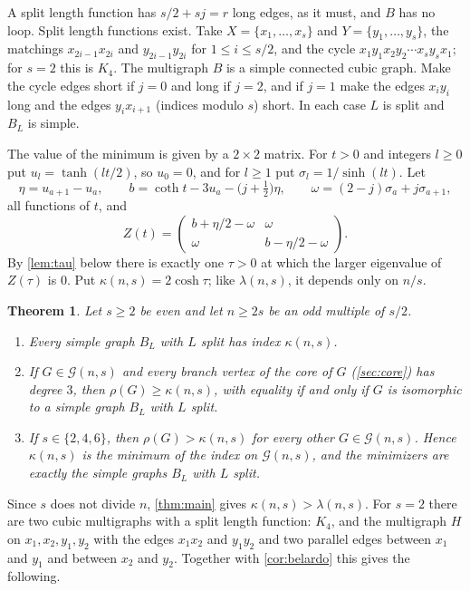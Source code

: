 \documentclass[11pt]{article}
\newtheorem{theorem}{Theorem}
\theoremstyle{definition}
\theoremstyle{remark}
\newcommand{\G}{\mathcal{G}}
\begin{document}
A split length function has $s/2+sj=r$ long edges, as it must, and $B$ has no loop. Split length functions exist. Take
$X=\{x_1,\dots,x_s\}$ and $Y=\{y_1,\dots,y_s\}$, the matchings $x_{2i-1}x_{2i}$ and $y_{2i-1}y_{2i}$ for $1\le i\le s/2$,
and the cycle $x_1y_1x_2y_2\cdots x_sy_sx_1$; for $s=2$ this is $K_4$. The multigraph $B$ is a simple connected cubic
graph. Make the cycle edges short if $j=0$ and long if $j=2$, and if $j=1$ make the edges $x_iy_i$ long and the edges
$y_ix_{i+1}$ (indices modulo $s$) short. In each case $L$ is split and $B_L$ is simple.

The value of the minimum is given by a $2\times2$ matrix. For $t>0$ and integers $l\ge0$ put $u_l=\tanh(lt/2)$, so
$u_0=0$, and for $l\ge1$ put $\sigma_l=1/\sinh(lt)$. Let
\[
\eta=u_{a+1}-u_a,\qquad b=\coth t-3u_a-\bigl(j+\tfrac12\bigr)\eta,\qquad \omega=(2-j)\sigma_a+j\sigma_{a+1},
\]
all functions of $t$, and
\begin{equation}\label{eq:Z}
Z(t)=\begin{pmatrix} b+\eta/2-\omega&\omega\\ \omega&b-\eta/2-\omega\end{pmatrix}.
\end{equation}
By \cref{lem:tau} below there is exactly one $\tau>0$ at which the larger eigenvalue of $Z(\tau)$ is $0$. Put
$\kappa(n,s)=2\cosh\tau$; like $\lambda(n,s)$, it depends only on $n/s$.

\begin{theorem}\label{thm:half}
Let $s\ge2$ be even and let $n\ge2s$ be an odd multiple of $s/2$.
\begin{enumerate}[label=(\alph*)]
\item Every simple graph $B_L$ with $L$ split has index $\kappa(n,s)$.
\item If $G\in\G(n,s)$ and every branch vertex of the core of $G$ (\cref{sec:core}) has degree $3$, then
$\rho(G)\ge\kappa(n,s)$, with equality if and only if $G$ is isomorphic to a simple graph $B_L$ with $L$ split.
\item If $s\in\{2,4,6\}$, then $\rho(G)>\kappa(n,s)$ for every other $G\in\G(n,s)$. Hence $\kappa(n,s)$ is the minimum
of the index on $\G(n,s)$, and the minimizers are exactly the simple graphs $B_L$ with $L$ split.
\end{enumerate}
\end{theorem}

Since $s$ does not divide $n$, \cref{thm:main} gives $\kappa(n,s)>\lambda(n,s)$. For $s=2$ there are two cubic
multigraphs with a split length function: $K_4$, and the multigraph $H$ on $x_1,x_2,y_1,y_2$ with the edges
$x_1x_2$ and $y_1y_2$ and two parallel edges between $x_1$ and $y_1$ and between $x_2$ and $y_2$. Together with
\cref{cor:belardo} this gives the following.
\end{document}
